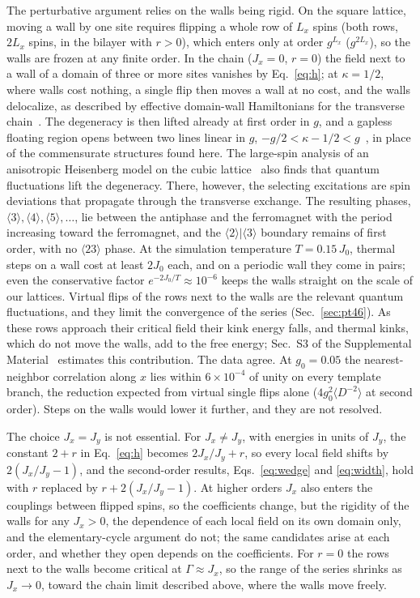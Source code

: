 \documentclass[
 aps,prb,
 twocolumn,
 superscriptaddress,
 longbibliography,
 nofootinbib,
 floatfix
]{revtex4-2}
\begin{document}
The perturbative argument relies on the walls being rigid. On the square lattice, moving a wall by
one site requires flipping a whole row of $L_x$ spins (both rows, $2L_x$ spins, in the bilayer with
$r>0$), which enters only at order $g^{L_x}$ ($g^{2L_x}$), so the walls are frozen at any finite
order. In the chain ($J_x=0$, $r=0$) the field next to a wall of a domain of three or more sites vanishes by
Eq.~\eqref{eq:h}; at $\kappa=1/2$, where walls cost nothing, a single flip then moves a wall at no cost, and the walls delocalize, as described by
effective domain-wall Hamiltonians for the transverse chain~\cite{rieger1996one}. The degeneracy is
then lifted already at first order in $g$, and a gapless floating region opens between two lines
linear in $g$, $-g/2<\kappa-1/2<g$~\cite{chandra2007floating}, in place of the commensurate structures
found here. The large-spin analysis of an anisotropic Heisenberg model on the cubic
lattice~\cite{harris1995quantum,harris1995quantumb} also finds that quantum fluctuations lift the
degeneracy. There, however, the selecting excitations are spin deviations that propagate through the
transverse exchange. The resulting phases, $\langle3\rangle,\langle4\rangle,\langle5\rangle,\dots$, lie between
the antiphase and the ferromagnet with the period increasing toward the ferromagnet, and the
$\langle2\rangle|\langle3\rangle$ boundary remains of first order, with no $\langle23\rangle$ phase.
At the simulation temperature $T=0.15\,J_0$, thermal steps on a wall cost at least $2J_0$ each, and on a
periodic wall they come in pairs; even the conservative factor $e^{-2J_0/T}\approx10^{-6}$ keeps the walls
straight on the scale of our lattices. Virtual flips of the rows next to the walls are the relevant quantum
fluctuations, and they limit the convergence of the series (Sec.~\ref{sec:pt46}). As these rows approach their critical
field their kink energy falls, and thermal kinks, which do not move the walls, add to the free energy; Sec.~S3 of the Supplemental
Material~\cite{supp} estimates this contribution. The data agree. At $g_0=0.05$ the nearest-neighbor correlation along $x$ lies within
$6\times10^{-4}$ of unity on every template branch, the reduction expected from virtual single flips
alone ($4g_0^2\langle D^{-2}\rangle$ at second order). Steps on the walls would lower it further, and
they are not resolved.

The choice $J_x=J_y$ is not essential. For $J_x\neq J_y$, with energies in units of $J_y$, the constant $2+r$ in
Eq.~\eqref{eq:h} becomes $2J_x/J_y+r$, so every local field shifts by $2(J_x/J_y-1)$, and the second-order results,
Eqs.~\eqref{eq:wedge} and \eqref{eq:width}, hold with $r$ replaced by $r+2(J_x/J_y-1)$. At higher orders $J_x$ also enters the couplings between flipped spins, so the coefficients
change, but the rigidity of the walls for any $J_x>0$, the dependence of each local field on its own domain only, and
the elementary-cycle argument do not; the same candidates arise at each order, and whether they open depends on the
coefficients. For $r=0$ the rows next to the walls become critical at $\Gamma\approx J_x$, so the range of the series
shrinks as $J_x\to0$, toward the chain limit described above, where the walls move freely.
\end{document}
